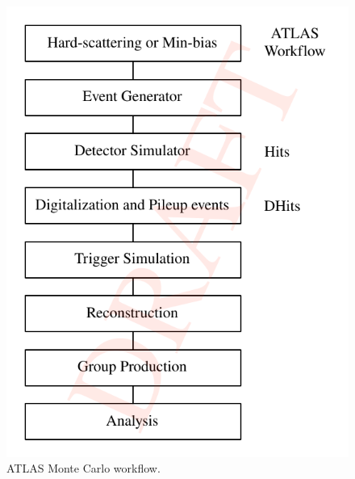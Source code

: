 \begin{figure}
  \includegraphics[width=\columnwidth]{figures/atlas_workflow.pdf}
  \caption{ATLAS Monte Carlo workflow.}
\label{fig:atlas_workflow}
\end{figure}
